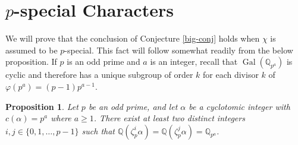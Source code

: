 \documentclass[12pt]{amsart}
\newtheorem{proposition}[theorem]{Proposition}
\theoremstyle{definition}
\newcommand{\Q}{\mathbb{Q}}
\DeclareMathOperator{\Gal}{Gal}
\begin{document}
\section{$p$-special Characters}

We will prove that the conclusion of Conjecture \ref{big-conj} holds when $\chi$ is assumed to be $p$-special. This fact will follow somewhat readily from the below proposition. If $p$ is an odd prime and $a$ is an integer, recall that $\Gal(\Q_{p^a})$ is cyclic and therefore has a unique subgroup of order $k$ for each divisor $k$ of $\varphi(p^a) = (p-1)p^{a-1}$.

\begin{proposition}
	Let $p$ be an odd prime, and let $\alpha$ be a cyclotomic integer with $c(\alpha) = p^a$ where $a \geq 1$. There exist at least two distinct integers $i, j \in \{0,1,\ldots, p-1\}$ such that $\Q(\zeta_p^i\alpha) = \Q(\zeta_p^j\alpha) = \Q_{p^a}$.
\end{proposition}
\end{document}
